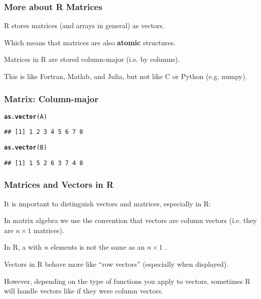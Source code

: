 \documentclass[12pt]{beamer}\usepackage[]{graphicx}\usepackage[]{color}
\makeatletter
\newcommand{\hlstd}[1]{\textcolor[rgb]{0.345,0.345,0.345}{#1}}%
\newcommand{\hlkwd}[1]{\textcolor[rgb]{0.737,0.353,0.396}{\textbf{#1}}}%
\newenvironment{kframe}{%
 \def\at@end@of@kframe{}%
 \ifinner\ifhmode%
  \def\at@end@of@kframe{\end{minipage}}%
  \begin{minipage}{\columnwidth}%
 \fi\fi%
 \def\FrameCommand##1{\hskip\@totalleftmargin \hskip-\fboxsep
 \colorbox{shadecolor}{##1}\hskip-\fboxsep
     \hskip-\linewidth \hskip-\@totalleftmargin \hskip\columnwidth}%
 \MakeFramed {\advance\hsize-\width
   \@totalleftmargin\z@ \linewidth\hsize
   \@setminipage}}%
 {\par\unskip\endMakeFramed%
 \at@end@of@kframe}
\newenvironment{knitrout}{}{} %
\makeatother
\begin{document}

\begin{frame}
\frametitle{More about R Matrices}

\bbi
  \item R stores matrices (and arrays in general) as vectors.
  \item Which means that matrices are also \textbf{atomic} structures.
  \item Matrices in R are stored column-major (i.e. by columns).
  \item This is like Fortran, Matlab, and Julia, but not like C or Python (e.g. numpy).
\ei

\end{frame}


\begin{frame}[fragile]
\frametitle{Matrix: Column-major}

\begin{knitrout}\footnotesize
{}\color{fgcolor}\begin{kframe}
\begin{alltt}
\hlkwd{as.vector}\hlstd{(A)}
\end{alltt}
\begin{verbatim}
## [1] 1 2 3 4 5 6 7 8
\end{verbatim}
\begin{alltt}
\hlkwd{as.vector}\hlstd{(B)}
\end{alltt}
\begin{verbatim}
## [1] 1 5 2 6 3 7 4 8
\end{verbatim}
\end{kframe}
\end{knitrout}

\end{frame}


\begin{frame}
\frametitle{Matrices and Vectors in R}

It is important to distinguish vectors and matrices, especially in R:
\bi
  \item In matrix algebra we use the convention that vectors are column vectors 
  (i.e. they are $n \times 1$ matrices).
  \item In R, a  with $n$ elements is not the same as an $n \times 1$ .
  \item Vectors in R behave more like ``row vectors'' (especially when displayed).
  \item However, depending on the type of functions you apply to vectors, sometimes R will handle vectors like if they were column vectors.
\ei

\end{frame}
\end{document}
